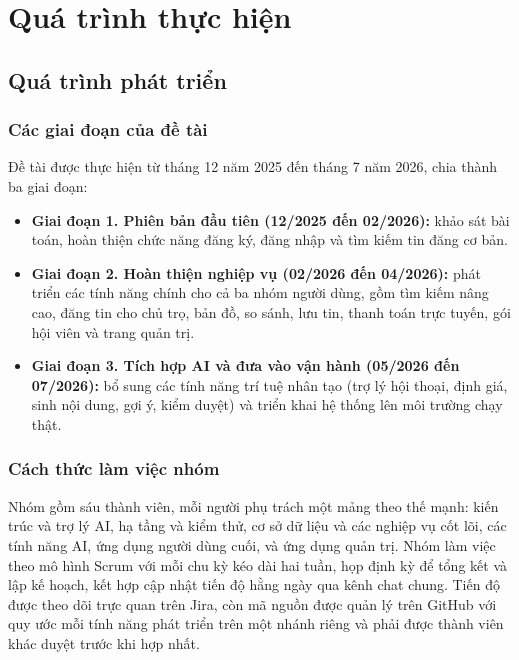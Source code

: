 \chapter{Quá trình thực hiện}
\label{Chapter5}

\section{Quá trình phát triển}

\FloatBarrier
\subsection{Các giai đoạn của đề tài}

Đề tài được thực hiện từ tháng 12 năm 2025 đến tháng 7 năm 2026, chia thành ba giai đoạn:

\begin{itemize}
    \item \textbf{Giai đoạn 1. Phiên bản đầu tiên (12/2025 đến 02/2026):} khảo sát bài toán, hoàn thiện chức năng đăng ký, đăng nhập và tìm kiếm tin đăng cơ bản.
    \item \textbf{Giai đoạn 2. Hoàn thiện nghiệp vụ (02/2026 đến 04/2026):} phát triển các tính năng chính cho cả ba nhóm người dùng, gồm tìm kiếm nâng cao, đăng tin cho chủ trọ, bản đồ, so sánh, lưu tin, thanh toán trực tuyến, gói hội viên và trang quản trị.
    \item \textbf{Giai đoạn 3. Tích hợp AI và đưa vào vận hành (05/2026 đến 07/2026):} bổ sung các tính năng trí tuệ nhân tạo (trợ lý hội thoại, định giá, sinh nội dung, gợi ý, kiểm duyệt) và triển khai hệ thống lên môi trường chạy thật.
\end{itemize}

\FloatBarrier
\subsection{Cách thức làm việc nhóm}
\label{sec:teamwork}

Nhóm gồm sáu thành viên, mỗi người phụ trách một mảng theo thế mạnh: kiến trúc và trợ lý AI, hạ tầng và kiểm thử, cơ sở dữ liệu và các nghiệp vụ cốt lõi, các tính năng AI, ứng dụng người dùng cuối, và ứng dụng quản trị. Nhóm làm việc theo mô hình Scrum với mỗi chu kỳ kéo dài hai tuần, họp định kỳ để tổng kết và lập kế hoạch, kết hợp cập nhật tiến độ hằng ngày qua kênh chat chung. Tiến độ được theo dõi trực quan trên Jira, còn mã nguồn được quản lý trên GitHub với quy ước mỗi tính năng phát triển trên một nhánh riêng và phải được thành viên khác duyệt trước khi hợp nhất.

